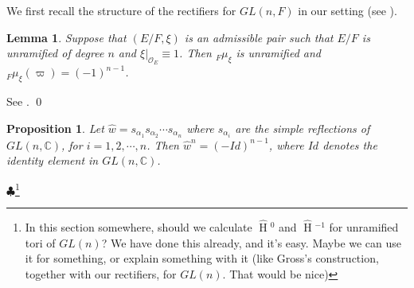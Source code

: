\documentclass[11pt]{amsart}
\theoremstyle{plain}
\newtheorem{proposition}[theorem]{Proposition}
\newtheorem{lemma}[theorem]{Lemma}
\newcommand{\MAxxx}[1]{$\clubsuit$\footnote{#1}}
\newcommand{\HT}[1]{\hat{\HH}{}^{#1}}
\theoremstyle{definition}
\DeclareMathOperator{\HH}{H}
\begin{document}
We first recall the structure of the rectifiers for $GL(n,F)$ in our
setting (see \cite{bushnellhenniart}).

\begin{lemma}
  Suppose that $(E/F, \xi)$ is an admissible pair such that $E/F$ is
  unramified of degree $n$ and $\xi|_{\mathcal{O}_E} \equiv 1$.  
  Then ${}_F \mu_{\xi}$ is unramified and
  ${}_F \mu_{\xi}(\varpi) = (-1)^{n-1}$.
\end{lemma}

\proof
See \cite[Proposition 21]{bushnellhenniart}.
\qed

\begin{proposition}
Let $\hat{w} = s_{\alpha_1} s_{\alpha_2} \cdots s_{\alpha_n}$ where 
$s_{\alpha_i}$ are the simple reflections of $GL(n,\mathbb{C})$, 
for $i = 1, 2, \cdots, n$.  Then $\hat{w}^n = (-Id)^{n-1}$, where $Id$
denotes the identity element in $GL(n,\mathbb{C})$.
\end{proposition}

\MAxxx{In this section somewhere, should we calculate $\HT{0}$ and
  $\HT{-1}$ for unramified tori of $GL(n)$? We have done this
  already, and it's easy.  Maybe we can use it for something, or
  explain something with it (like Gross's construction, together with
  our rectifiers, for $GL(n)$.  That would be nice)}
\end{document}
